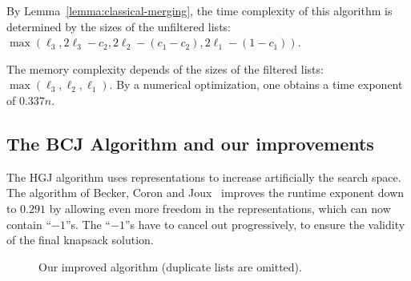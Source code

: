 By Lemma~\ref{lemma:classical-merging}, the time complexity of this algorithm is determined by the sizes of the unfiltered lists:~~$ \max\left( \ell_3, 2\ell_3 - c_2, 2\ell_2 - (c_1 - c_2), 2 \ell_1 - (1-c_1) \right)$.

The memory complexity depends of the sizes of the filtered lists: $\max\left( \ell_3, \ell_2, \ell_1\right)$. By a numerical optimization, one obtains a time exponent of $0.337 n$.


\subsection{The BCJ Algorithm and our improvements}\label{subsection:new-classical-bcj}

The HGJ algorithm uses representations to increase artificially the search space. The algorithm of Becker, Coron and Joux~\cite{DBLP:conf/eurocrypt/BeckerCJ11} improves the runtime exponent down to $0.291$ by allowing even more freedom in the representations, which can now contain ``$-1$''s. The ``$-1$''s have to cancel out progressively, to ensure the validity of the final knapsack solution.

\begin{figure}[htb]
\centering
{}
\caption{Our improved algorithm (duplicate lists are omitted).}
\label{fig:bcj-original}
\end{figure}

